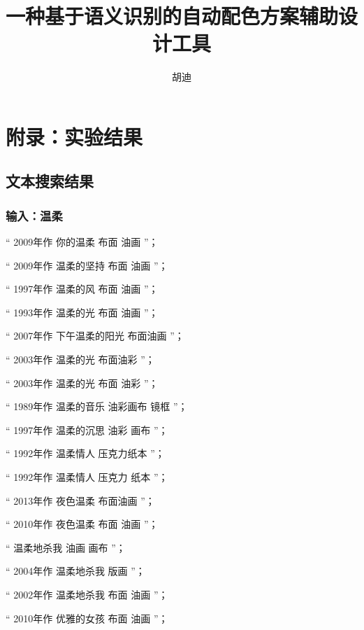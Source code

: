 \documentclass[master,oneside]{zjuthesis}
\title{一种基于语义识别的自动配色方案辅助设计工具}
\author{胡迪}
\institute{计算机科学与技术学院}
\begin{document}
\maketitle
\frontmatter



\tableofcontents
\listoffigures
\listoftables

\mainmatter

%





\backmatter


\appendix
\chapter{附录：实验结果}
\section{文本搜索结果}
\footnotesize
\subsection{输入：温柔}
“ 2009年作 你的温柔 布面 油画 ”；

“ 2009年作 温柔的坚持 布面 油画 ”；

“ 1997年作 温柔的风 布面 油画 ”；

“ 1993年作 温柔的光 布面 油画 ”；

“ 2007年作 下午温柔的阳光 布面油画 ”；

“ 2003年作 温柔的光 布面油彩 ”；

“ 2003年作 温柔的光 布面 油彩 ”；

“ 1989年作 温柔的音乐 油彩画布 镜框 ”；

“ 1997年作 温柔的沉思 油彩 画布 ”；

“ 1992年作 温柔情人 压克力纸本 ”；

“ 1992年作 温柔情人 压克力 纸本 ”；

“ 2013年作 夜色温柔 布面油画 ”；

“ 2010年作 夜色温柔 布面 油画 ”；

“ 温柔地杀我 油画 画布 ”；

“ 2004年作 温柔地杀我 版画 ”；

“ 2002年作 温柔地杀我 布面 油画 ”；

“ 2010年作 优雅的女孩 布面 油画 ”；
\end{document}
